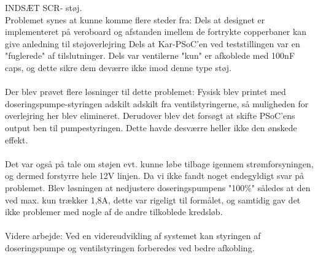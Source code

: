	INDSÆT SCR- støj.\\ 

Problemet synes at kunne komme flere steder fra: 
Dels at designet er implementeret på veroboard og afstanden imellem de fortrykte copperbaner kan give anledning til støjoverlejring
Dels at Kar-PSoC'en ved teststillingen var en "fuglerede" af tilslutninger. 
Dels var ventilerne "kun" er afkoblede med 100nF caps, og dette sikre dem deværre ikke imod denne type støj.\\\\

Der blev prøvet flere løsninger til dette problemet: 
Fysisk blev printet med doseringspumpe-styringen adskilt adskilt fra ventilstyringerne, så muligheden for overlejring her blev elimineret. 
Derudover blev det forsøgt at skifte PSoC'ens output ben til pumpestyringen. Dette havde desværre heller ikke den ønskede effekt.\\\\ 

Det var også på tale om støjen evt. kunne løbe tilbage igennem strømforsyningen, og dermed forstyrre hele 12V linjen. 
Da vi ikke fandt noget endegyldigt svar på problemet. Blev løsningen at nedjustere doseringspumpens "100\%" således at den ved max. kun trækker 1,8A, dette var rigeligt til formålet, og samtidig gav det ikke problemer med nogle af de andre tilkoblede kredsløb.\\\\


Videre arbejde:
Ved en videreudvikling af systemet kan styringen af doseringspumpe og ventilstyringen forberedes ved bedre afkobling.
